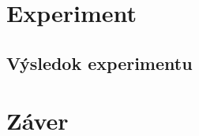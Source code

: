 \documentclass[10pt,oneside,slovak,a4paper]{article}
\begin{document}
\section{Experiment} \label{dolezita}




\subsection{Výsledok experimentu} \label{dolezitejsia}




\section{Záver} \label{zaver} %







\end{document}
